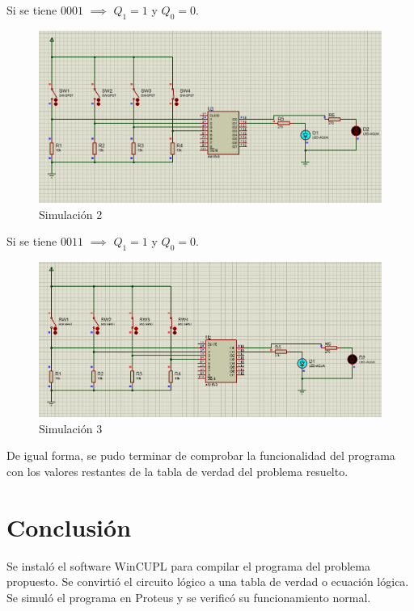 \documentclass{article}
\begin{document}
    \bigbreak

    Si se tiene $0001$ $\implies$ $Q_1 = 1$ y $Q_0 = 0$.


    \begin{figure}[H]
        \centering
        \includegraphics[width=0.5\paperwidth]{images/proteus-sim-2}
        \caption{Simulación 2}
    \end{figure}

    \bigbreak

    Si se tiene $0011$ $\implies$ $Q_1 = 1$ y $Q_0 = 0$.


    \begin{figure}[H]
        \centering
        \includegraphics[width=0.5\paperwidth]{images/proteus-sim-3}
        \caption{Simulación 3}
    \end{figure}

    De igual forma, se pudo terminar de comprobar la funcionalidad del programa con los valores restantes de la tabla de verdad del problema resuelto.

    \section{Conclusión}\label{sec:conclusion}

    Se instaló el software WinCUPL para compilar el programa del problema propuesto. Se convirtió el circuito lógico a una tabla de verdad o ecuación lógica. Se simuló el programa en Proteus y se verificó su funcionamiento normal.

    \printbibliography
\end{document}
